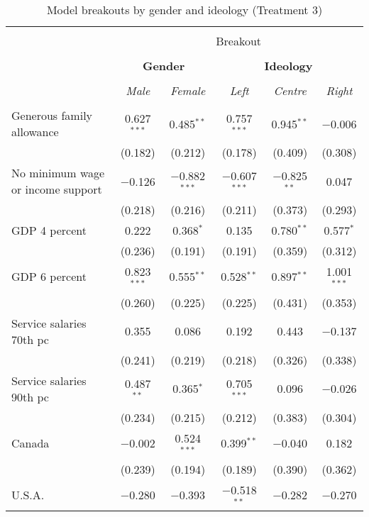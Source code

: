 \documentclass[12pt]{article}
\begin{document}
\begin{appendices}
\begin{landscape}
\begin{table}[!htbp] \centering \footnotesize
  \caption{Model breakouts by gender and ideology (Treatment 3)} 
  \label{tab:results_breakout3} 
\begin{tabular}{@{\extracolsep{5pt}}lccccc} 
\\[-1.8ex]\hline 
\hline \\[-1.8ex] 
 & \multicolumn{5}{c}{Breakout} \\
 \cline{2-6} \\
 & \multicolumn{2}{c}{\textbf{Gender}} & \multicolumn{3}{c}{\textbf{Ideology}} \\  
\cline{2-6} 
\\[-1.8ex] & \textit{Male} & \textit{Female} & \textit{Left} & \textit{Centre} & \textit{Right}\\ 
\hline \\[-1.8ex] 
 Generous family allowance & 0.627$^{***}$ & 0.485$^{**}$ & 0.757$^{***}$ & 0.945$^{**}$ & $-$0.006 \\ 
  & (0.182) & (0.212) & (0.178) & (0.409) & (0.308) \\ 
  No minimum wage or income support & $-$0.126 & $-$0.882$^{***}$ & $-$0.607$^{***}$ & $-$0.825$^{**}$ & 0.047 \\ 
  & (0.218) & (0.216) & (0.211) & (0.373) & (0.293) \\ 
  GDP 4 percent & 0.222 & 0.368$^{*}$ & 0.135 & 0.780$^{**}$ & 0.577$^{*}$ \\ 
  & (0.236) & (0.191) & (0.191) & (0.359) & (0.312) \\ 
  GDP 6 percent & 0.823$^{***}$ & 0.555$^{**}$ & 0.528$^{**}$ & 0.897$^{**}$ & 1.001$^{***}$ \\ 
  & (0.260) & (0.225) & (0.225) & (0.431) & (0.353) \\ 
  Service salaries 70th pc & 0.355 & 0.086 & 0.192 & 0.443 & $-$0.137 \\ 
  & (0.241) & (0.219) & (0.218) & (0.326) & (0.338) \\ 
  Service salaries 90th pc & 0.487$^{**}$ & 0.365$^{*}$ & 0.705$^{***}$ & 0.096 & $-$0.026 \\ 
  & (0.234) & (0.215) & (0.212) & (0.383) & (0.304) \\ 
  Canada & $-$0.002 & 0.524$^{***}$ & 0.399$^{**}$ & $-$0.040 & 0.182 \\ 
  & (0.239) & (0.194) & (0.189) & (0.390) & (0.362) \\ 
  U.S.A. & $-$0.280 & $-$0.393 & $-$0.518$^{**}$ & $-$0.282 & $-$0.270 \\ 

\end{tabular}
\end{table}
\end{landscape}
\end{appendices}
\end{document}
